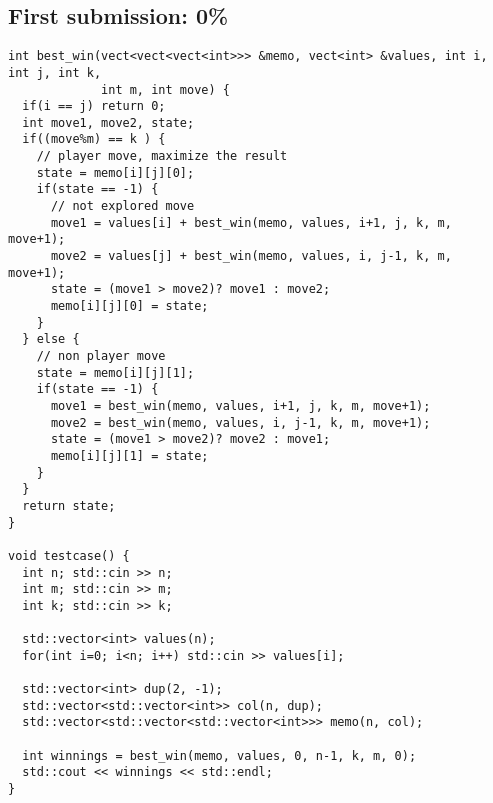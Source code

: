 \documentclass[12pt,letterpaper]{article}
\begin{document}
\small
\subsection*{First submission: 0\%}
\begin{verbatim}
int best_win(vect<vect<vect<int>>> &memo, vect<int> &values, int i, int j, int k,
             int m, int move) {
  if(i == j) return 0;
  int move1, move2, state;
  if((move%m) == k ) {
    // player move, maximize the result
    state = memo[i][j][0];
    if(state == -1) {
      // not explored move
      move1 = values[i] + best_win(memo, values, i+1, j, k, m, move+1);
      move2 = values[j] + best_win(memo, values, i, j-1, k, m, move+1);
      state = (move1 > move2)? move1 : move2;
      memo[i][j][0] = state;
    }
  } else {
    // non player move
    state = memo[i][j][1];
    if(state == -1) {
      move1 = best_win(memo, values, i+1, j, k, m, move+1);
      move2 = best_win(memo, values, i, j-1, k, m, move+1);
      state = (move1 > move2)? move2 : move1;
      memo[i][j][1] = state;
    }
  }
  return state;
}

void testcase() {
  int n; std::cin >> n;
  int m; std::cin >> m;
  int k; std::cin >> k;
  
  std::vector<int> values(n);
  for(int i=0; i<n; i++) std::cin >> values[i];  
  
  std::vector<int> dup(2, -1);
  std::vector<std::vector<int>> col(n, dup);
  std::vector<std::vector<std::vector<int>>> memo(n, col);
  
  int winnings = best_win(memo, values, 0, n-1, k, m, 0);
  std::cout << winnings << std::endl;
}
\end{verbatim}

\newpage
\end{document}
